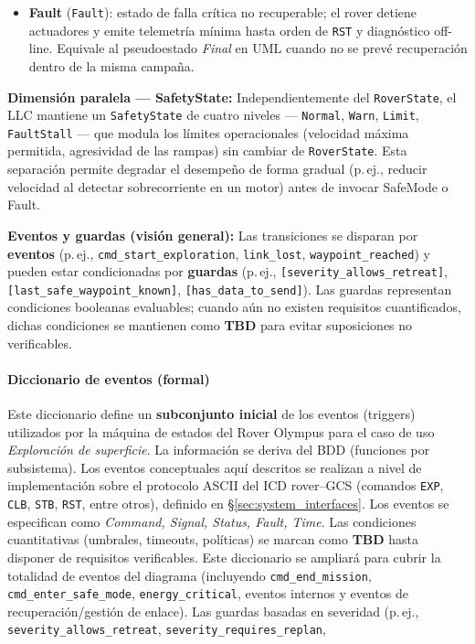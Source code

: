 \begin{itemize}
  \item \textbf{Fault} (\texttt{Fault}): estado de falla crítica no recuperable; el rover detiene actuadores y emite telemetría mínima hasta orden de \texttt{RST} y diagnóstico off-line. Equivale al pseudoestado \emph{Final} en UML cuando no se prevé recuperación dentro de la misma campaña. \cite{UMLStateMachinesConcepts2}
\end{itemize}

\textbf{Dimensión paralela --- SafetyState:} Independientemente del \texttt{RoverState}, el LLC mantiene un \texttt{SafetyState} de cuatro niveles --- \texttt{Normal}, \texttt{Warn}, \texttt{Limit}, \texttt{FaultStall} --- que modula los límites operacionales (velocidad máxima permitida, agresividad de las rampas) sin cambiar de \texttt{RoverState}. Esta separación permite degradar el desempeño de forma gradual (p.\,ej., reducir velocidad al detectar sobrecorriente en un motor) antes de invocar SafeMode o Fault.

\textbf{Eventos y guardas (visión general):}
Las transiciones se disparan por \textbf{eventos} (p.\,ej.,
\texttt{cmd\_\allowbreak start\_\allowbreak exploration},
\texttt{link\_\allowbreak lost},
\texttt{waypoint\_\allowbreak reached})
y pueden estar condicionadas por \textbf{guardas} (p.\,ej.,
\texttt{[severity\_\allowbreak allows\_\allowbreak retreat]},
\texttt{[last\_\allowbreak safe\_\allowbreak waypoint\_\allowbreak known]},
\texttt{[has\_\allowbreak data\_\allowbreak to\_\allowbreak send]}).
Las guardas representan condiciones booleanas evaluables; cuando aún no existen
requisitos cuantificados, dichas condiciones se mantienen como \textbf{TBD}
para evitar suposiciones no verificables.
\cite{UMLStateMachinesConcepts2,UMLStateMachinesConcepts1}

\paragraph{Diccionario de eventos (formal)}\label{para:uc01_events}
Este diccionario define un \textbf{subconjunto inicial} de los eventos (triggers) utilizados por la máquina de estados del Rover Olympus para el caso de uso \textit{Exploración de superficie}.
La información se deriva del BDD (funciones por subsistema).
Los eventos conceptuales aquí descritos se realizan a nivel de implementación sobre el protocolo ASCII del ICD rover--GCS (comandos \texttt{EXP}, \texttt{CLB}, \texttt{STB}, \texttt{RST}, entre otros), definido en \S\ref{sec:system_interfaces}.
Los eventos se especifican como \textit{Command, Signal, Status, Fault, Time}. 
Las condiciones cuantitativas (umbrales, timeouts, políticas) se marcan como \textbf{TBD} hasta disponer de requisitos verificables.
Este diccionario se ampliará para cubrir la totalidad de eventos del diagrama (incluyendo \texttt{cmd\_end\_mission}, \texttt{cmd\_enter\_safe\_mode}, \texttt{energy\_critical}, eventos internos y eventos de recuperación/gestión de enlace). 
Las guardas basadas en severidad (p.\,ej., \texttt{severity\_allows\_retreat}, \texttt{severity\_requires\_replan},


